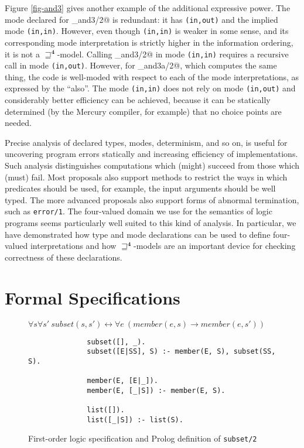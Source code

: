 \documentclass{tlp}
\newcommand{\Quad}{\ensuremath{\mathbf{4}}}
\begin{document}
Figure \ref{fig-and3} gives another example of the additional expressive
power.  The mode declared for \verb@fold_and3/2@ is redundant: it has
\texttt{(in,out)} and the implied mode \texttt{(in,in)}.  However, even
though \texttt{(in,in)} is weaker in some sense, and its corresponding
mode interpretation is strictly higher in the information ordering, it
is not a $\sqsupseteq^\Quad$-model.  Calling \verb@fold_and3/2@ in mode
\texttt{(in,in)} requires a recursive call in mode \texttt{(in,out)}.
However, for \verb@fold_and3a/2@, which computes the same thing, the
code is well-moded with respect to each of the mode interpretations, as
expressed by the ``also''.
The mode \texttt{(in,in)} does not rely on mode \texttt{(in,out)} and
considerably better efficiency can be achieved,
because it can be statically determined (by the Mercury compiler, for
example) that no choice points are needed.

Precise analysis of declared types, modes, determinism, and so on,
is useful for uncovering program errors statically and increasing 
efficiency of implementations.  
Such analysis distinguishes computations which
(might) succeed from those which (must) fail.  Most proposals also support
methods to restrict the ways in which predicates should be used, 
for example, the input arguments should be well typed.  
The more advanced proposals also support forms of abnormal termination,
such as \texttt{error/1}.
The four-valued domain we use for the semantics of logic programs 
seems particularly well suited to this kind of analysis.
In particular, we have demonstrated how type and mode declarations can
be used to define four-valued interpretations and how
$\sqsupseteq^\Quad$-models are an important device for checking
correctness of these declarations.





\section{Formal Specifications}
\label{sec-specification}

\begin{figure}
$\forall s \forall s' ~subset(s, s') \leftrightarrow \forall e~ (member(e, s) \rightarrow
member(e, s'))$

\begin{verbatim}
              subset([], _).
              subset([E|SS], S) :- member(E, S), subset(SS, S).

              member(E, [E|_]).
              member(E, [_|S]) :- member(E, S).

              list([]).
              list([_|S]) :- list(S).
\end{verbatim}
\caption{First-order logic specification and Prolog definition of
\texttt{subset/2} \label{fig-subset}}
\end{figure}
\end{document}
